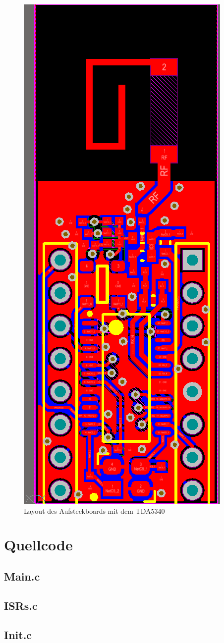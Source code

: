 \begin{figure}[h] 
	\centering
	\includegraphics[height=\textwidth, angle=-90 ]{Abbildungen/Aufnahmen/Bilder/Altium/Layout_Stefan_Erhard/Layout.png}
	\caption{Layout des Aufsteckboards mit dem TDA5340}
	\label{fig:AufsteckboardTDA}
\end{figure}

\section{Quellcode}
\subsection{Main.c}

\subsection{ISRs.c}

\subsection{Init.c}
